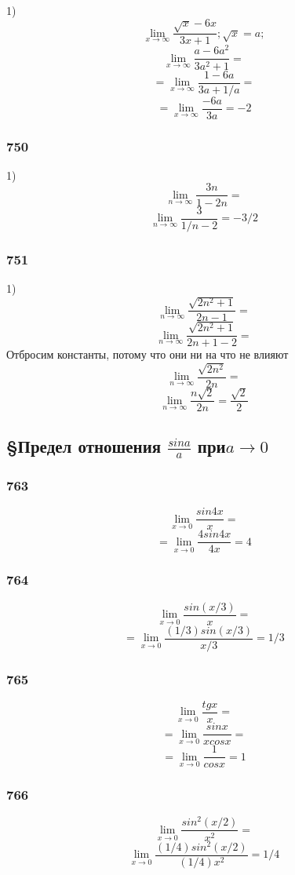 \documentclass[12pt]{article}
\begin{document}
1)\\
$$
\lim_{x\to \infty} \frac{\sqrt{x}-6x}{3x+1} ;
\sqrt{x} = a;
$$
$$
\lim_{x\to \infty} \frac{a-6a^2}{3a^2+1}=
$$
$$
=\lim_{x\to \infty} \frac{1-6a}{3a+1/a} = 
$$
$$
=\lim_{x\to \infty} \frac{-6a}{3a} = -2
$$

\newpage
\subsubsection{750}

1)\\
$$
\lim_{n\to \infty} \frac{3n}{1-2n}=
$$
$$
\lim_{n\to \infty} \frac{3}{1/n-2}=-3/2
$$


\newpage
\subsubsection{751}

1)\\
$$
\lim_{n\to \infty} \frac{\sqrt{2n^2+1}}{2n-1}=
$$
$$
\lim_{n\to \infty} \frac{\sqrt{2n^2+1}}{2n+1-2}=
$$
Отбросим константы, потому что они ни на что не влияют
$$
\lim_{n\to \infty} \frac{\sqrt{2n^2}}{2n}=
$$
$$
\lim_{n\to \infty} \frac{n\sqrt{2}}{2n}=\frac{\sqrt{2}}{2}
$$

\newpage
\subsection{\S Предел отношения $\frac{sin a}{a}$ при$  a \to 0$ }
\subsubsection{763}
$$
\lim_{x\to 0} \frac{sin4x}{x} = 
$$
$$
= \lim_{x\to 0} \frac{4sin4x}{4x} = 4 
$$

\newpage
\subsubsection{764}
$$
\lim_{x\to 0} \frac{sin(x/3)}{x} = 
$$
$$
= \lim_{x\to 0} \frac{(1/3)sin(x/3)}{x/3} = 1/3 
$$

\newpage
\subsubsection{765}
$$
\lim_{x\to 0} \frac{tgx}{x} = 
$$
$$
= \lim_{x\to 0} \frac{sinx}{xcosx} =  
$$
$$
= \lim_{x\to 0} \frac{1}{cosx} = 1 
$$

\newpage
\subsubsection{766}
$$
\lim_{x\to 0} \frac{sin^2(x/2)}{x^2} = 
$$
$$
\lim_{x\to 0} \frac{(1/4)sin^2(x/2)}{(1/4)x^2} =1/4 
$$
\end{document}
